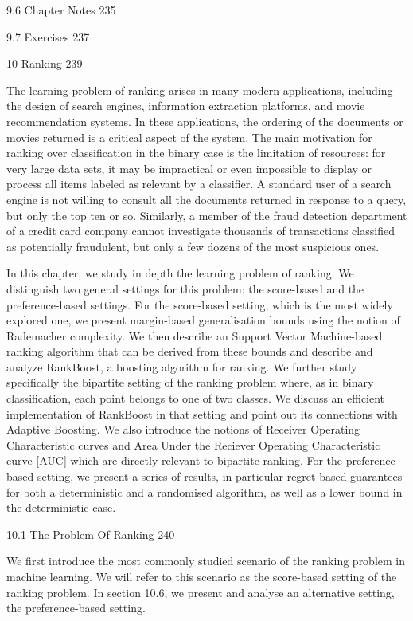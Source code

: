 9.6 Chapter Notes 235



9.7 Exercises 237



10 Ranking 239

The learning problem of ranking arises in many modern applications, including the design of search engines, information extraction platforms, and movie recommendation systems. In these applications, the ordering of the documents or movies returned is a critical aspect of the system. The main motivation for ranking over classification in the binary case is the limitation of resources: for very large data sets, it may be impractical or even impossible to display or process all items labeled as relevant by a classifier. A standard user of a search engine is not willing to consult all the documents returned in response to a query, but only the top ten or so. Similarly, a member of the fraud detection department of a credit card company cannot investigate thousands of transactions classified as potentially fraudulent, but only a few dozens of the most suspicious ones.

In this chapter, we study in depth the learning problem of ranking. We distinguish two general settings for this problem: the score-based and the preference-based settings. For the score-based setting, which is the most widely explored one, we present margin-based generalisation bounds using the notion of Rademacher complexity. We then describe an Support Vector Machine-based ranking algorithm that can be derived from these bounds and describe and analyze RankBoost, a boosting algorithm for ranking. We further study specifically the bipartite setting of the ranking problem where, as in binary classification, each point belongs to one of two classes. We discuss an efficient implementation of RankBoost in that setting and point out its connections with Adaptive Boosting. We also introduce the notions of Receiver Operating Characteristic curves and Area Under the Reciever Operating Characteristic curve [AUC] which are directly relevant to bipartite ranking. For the preference-based setting, we present a series of results, in particular regret-based guarantees for both a deterministic and a randomised algorithm, as well as a lower bound in the deterministic case.

10.1 The Problem Of Ranking 240

We first introduce the most commonly studied scenario of the ranking problem in machine learning. We will refer to this scenario as the score-based setting of the ranking problem. In section 10.6, we present and analyse an alternative setting, the preference-based setting.

